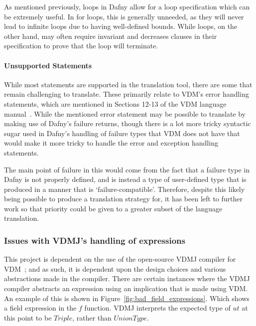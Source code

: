 \documentclass{entcs}
\begin{document}
As mentioned previously, loops in Dafny allow for a loop specification which can be extremely useful. In for loops, this is generally unneeded, as they will never lead to infinite loops due to having well-defined bounds. While loops, on the other hand, may often require invariant and decreases clauses in their specification to prove that the loop will terminate.

\paragraph{Unsupported Statements}

While most statements are supported in the translation tool, there are some that remain challenging to translate. These primarily relate to VDM's error handling statements, which are mentioned in Sections 12-13 of the VDM language manual~\cite{VDMLangMan}. While the mentioned error statement may be possible to translate by making use of Dafny's failure returns, though there is a lot more tricky syntactic sugar used in Dafny's handling of failure types that VDM does not have that would make it more tricky to handle the error and exception handling statements.

The main point of failure in this would come from the fact that a failure type in Dafny is not properly defined, and is instead a type of user-defined type that is produced in a manner that is `failure-compatible'. Therefore, despite this likely being possible to produce a translation strategy for, it has been left to further work so that priority could be given to a greater subset of the language translation.




\subsubsection{Issues with VDMJ's handling of expressions}
\label{section:vdmj_expression_issue_unions}

This project  is dependent on the use of the open-source VDMJ compiler for VDM~\cite{VDMJ}; and as such, it is dependent upon the design choices and various abstractions made in the compiler. There are certain instances where the VDMJ compiler abstracts an expression using an implication that is made using VDM. An example of this is shown in Figure~\ref{fig:bad_field_expressions}. Which shows a field expression in the $f$ function. VDMJ interprets the expected type of $ut$ at this point to be $Triple$, rather than $UnionType$. 
\end{document}
